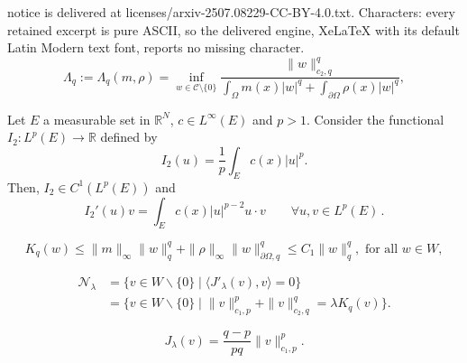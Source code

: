 \documentclass[10pt,a4paper]{amsart}
\begin{document}
notice is delivered at licenses/arxiv-2507.08229-CC-BY-4.0.txt. Characters: every retained excerpt is pure ASCII, so the delivered engine, XeLaTeX with its default Latin Modern text font, reports no missing character.
\begin{equation}\label{Lambda_q}
\Lambda_q:= \Lambda_q(m,\rho)=\inf_{w \in \mathcal{C} \setminus \{0\}} \frac{\|w\|_{c_2,q}^q}{\int_\Omega m(x)|w|^{q}+ \int_{\partial\Omega} \rho(x)|w|^{q}},
\end{equation}

\begin{proposition}\label{prop-cu}
Let $E$ a measurable set in $\mathbb{R}^N$, $c\in L^\infty(E)$ and $p>1$. Consider the functional $I_2:L^{p}(E)\to \mathbb{R}$ defined by
\begin{equation*}
I_2(u)=\frac{1}{p}\int_{E} c(x)|u|^p.
\end{equation*}
Then, $I_2\in C^1(L^{p}(E))$ and 
 \begin{equation*}
I_2'(u)v=\int_{E} c(x)|u|^{p-2} u\cdot v  \qquad \forall  u, v \in L^{p}(E) \,.
\end{equation*}
\end{proposition}

    \begin{equation}\label{bound-K_q}
        K_q(w) \leqslant \|m\|_\infty \|w\|_q^q+ \|\rho \|_\infty \|w\|_{\partial\Omega, q}^q \leqslant C_1 \|w\|_q^q, \mbox{ for all } w\in W,
    \end{equation}

\begin{align}\label{def_Nehari}\mathcal{N}_{\lambda}&=\{v\in W\backslash\{0\}\;|\;\langle J'_\lambda (v),v\rangle=0\}\nonumber\\
    &=\{v\in W\backslash\{0\}\;|\; \|v \|_{c_1,p}^p+\|v \|_{c_2,q}^q=\lambda K_q(v)\}.
\end{align}

\begin{equation}\label{J_rest_eta}
    J_{\lambda}(v)=\frac{q-p}{pq}\|v \|_{c_1,p}^p.
\end{equation}
\end{document}
